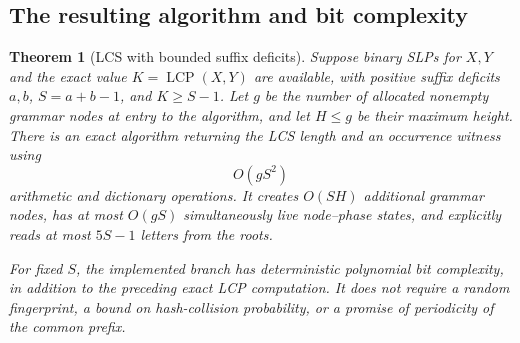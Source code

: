 \documentclass[11pt]{article}
\newtheorem{theorem}{Theorem}[section]
\theoremstyle{definition}
\theoremstyle{remark}
\newcommand{\LCP}{\operatorname{LCP}}
\begin{document}
\subsection{The resulting algorithm and bit complexity}

\begin{theorem}[LCS with bounded suffix deficits]
\label{thm:near-prefix-lcs}
Suppose binary SLPs for $X,Y$ and the exact value $K=\LCP(X,Y)$ are
available, with positive suffix deficits $a,b$, $S=a+b-1$, and
$K\ge S-1$. Let $g$ be the number of allocated nonempty grammar nodes
at entry to the algorithm, and let $H\le g$ be their maximum height.
There is an exact algorithm returning the LCS length and an occurrence
witness using
\[
 O(gS^2)
\]
arithmetic and dictionary operations. It creates $O(SH)$ additional
grammar nodes, has at most $O(gS)$ simultaneously live node--phase
states, and explicitly reads at most $5S-1$ letters from the roots.

For fixed $S$, the implemented branch has deterministic polynomial bit
complexity, in addition to the preceding exact LCP computation. It does
not require a random fingerprint, a bound on hash-collision probability,
or a promise of periodicity of the common prefix.
\end{theorem}
\end{document}

